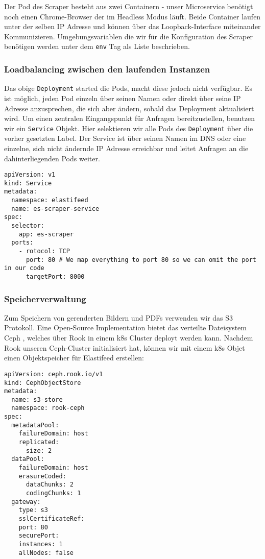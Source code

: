 Der Pod des Scraper besteht aus zwei Containern - unser Microservice benötigt noch einen Chrome-Browser der im Headless Modus läuft.
Beide Container laufen unter der selben IP Adresse und können über das Loopback-Interface miteinander Kommunizieren.
Umgebungsvariablen die wir für die Konfiguration des Scraper benötigen werden unter dem \texttt{env} Tag als Liste beschrieben.

\subsubsection{Loadbalancing zwischen den laufenden Instanzen}
Das obige \texttt{Deployment} started die Pods, macht diese jedoch nicht verfügbar.
Es ist möglich, jeden Pod einzeln über seinen Namen oder direkt über seine IP Adresse anzusprechen, die sich aber ändern, sobald das Deployment aktualisiert wird.
Um einen zentralen Eingangspunkt für Anfragen bereitzustellen, benutzen wir ein \texttt{Service} Objekt.
Hier selektieren wir alle Pods des \texttt{Deployment} über die vorher gesetzten Label.
Der Service ist über seinen Namen im DNS oder eine einzelne, sich nicht ändernde IP Adresse erreichbar und leitet Anfragen an die dahinterliegenden Pods weiter.

\begin{verbatim}
apiVersion: v1
kind: Service
metadata:
  namespace: elastifeed
  name: es-scraper-service
spec:
  selector:
    app: es-scraper
  ports:
    - rotocol: TCP 
      port: 80 # We map everything to port 80 so we can omit the port in our code
      targetPort: 8000
\end{verbatim}

\subsubsection{Speicherverwaltung}
Zum Speichern von gerenderten Bildern und PDFs verwenden wir das S3 Protokoll.
Eine Open-Source Implementation bietet das verteilte Dateisystem Ceph \cite{ceph}, welches über Rook \cite{rook} in einem \ac{k8s} Cluster deployt werden kann.
Nachdem Rook unseren Ceph-Cluster initialisiert hat, können wir mit einem \ac{k8s} Objet einen Objektspeicher für Elastifeed erstellen:

\begin{verbatim}
apiVersion: ceph.rook.io/v1
kind: CephObjectStore
metadata:
  name: s3-store
  namespace: rook-ceph
spec:
  metadataPool:
    failureDomain: host
    replicated:
      size: 2
  dataPool:
    failureDomain: host
    erasureCoded:
      dataChunks: 2
      codingChunks: 1
  gateway:
    type: s3
    sslCertificateRef:
    port: 80
    securePort:
    instances: 1
    allNodes: false
\end{verbatim}

